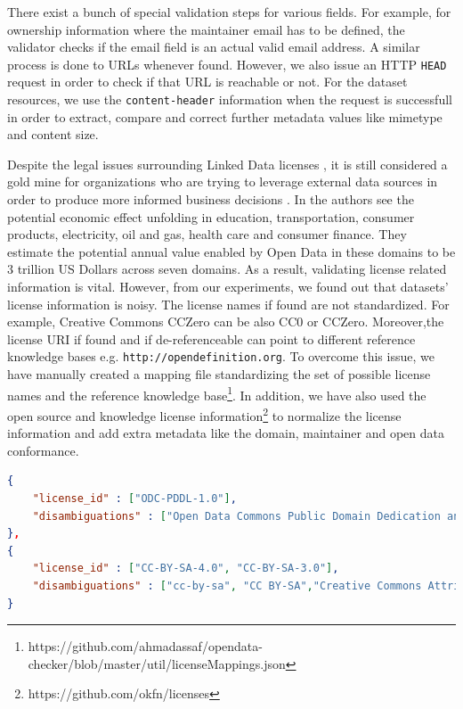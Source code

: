 \documentclass[runningheads,a4paper]{llncs}
\begin{document}
There exist a bunch of special validation steps for various fields. For example, for ownership information where the maintainer email has to be defined, the validator checks if the email field is an actual valid email address. A similar process is done to URLs whenever found. However, we also issue an HTTP \texttt{HEAD} request in order to check if that URL is reachable or not. For the dataset resources, we use the \texttt{content-header} information when the request is successfull in order to extract, compare and correct further metadata values like mimetype and content size.

Despite the legal issues surrounding Linked Data licenses \cite{nomoneyLOD}, it is still considered a gold mine for organizations who are trying to leverage external data sources in order to produce more informed business decisions \cite{Boyd2011}. In \cite{mckinseyreport} the authors see the potential economic effect unfolding in education, transportation, consumer products, electricity, oil and gas, health care and consumer finance. They estimate the potential annual value enabled by Open Data in these domains to be 3 trillion US Dollars across seven domains. As a result, validating license related information is vital. However, from our experiments, we found out that datasets' license information is noisy. The license names if found are not standardized. For example, Creative Commons CCZero can be also CC0 or CCZero. Moreover,the license URI if found and if de-referenceable can point to different reference knowledge bases e.g. \texttt{http://opendefinition.org}. To overcome this issue, we have manually created a mapping file standardizing the set of possible license names and the reference knowledge base\footnote{https://github.com/ahmadassaf/opendata-checker/blob/master/util/licenseMappings.json}. In addition, we have also used the open source and knowledge license information\footnote{https://github.com/okfn/licenses} to normalize the license information and add extra metadata like the domain, maintainer and open data conformance. \\

\begin{lstlisting}[language=json]
{
	"license_id" : ["ODC-PDDL-1.0"],
	"disambiguations" : ["Open Data Commons Public Domain Dedication and License (PDDL)"]
},
{
	"license_id" : ["CC-BY-SA-4.0", "CC-BY-SA-3.0"],
	"disambiguations" : ["cc-by-sa", "CC BY-SA","Creative Commons Attribution Share-Alike"]
}
\end{lstlisting}
\end{document}
